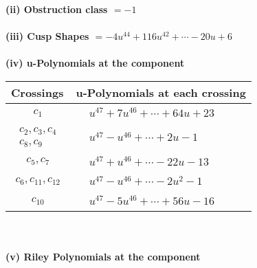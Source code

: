 \documentclass[1p]{elsarticle_modified}
\theoremstyle{definition}
\begin{document}
\flushleft \textbf{(ii) Obstruction class $= -1$}\\~\\
\flushleft \textbf{(iii) Cusp Shapes $= -4 u^{44}+116 u^{42}+\cdots-20 u+6$}\\~\\
\newpage\renewcommand{\arraystretch}{1}
\flushleft \textbf{(iv) u-Polynomials at the component}\newline \\
\begin{tabular}{m{50pt}|m{274pt}}
Crossings & \hspace{64pt}u-Polynomials at each crossing \\
\hline $$\begin{aligned}c_{1}\end{aligned}$$&$\begin{aligned}
&u^{47}+7 u^{46}+\cdots+64 u+23
\end{aligned}$\\
\hline $$\begin{aligned}c_{2},c_{3},c_{4}\\c_{8},c_{9}\end{aligned}$$&$\begin{aligned}
&u^{47}- u^{46}+\cdots+2 u-1
\end{aligned}$\\
\hline $$\begin{aligned}c_{5},c_{7}\end{aligned}$$&$\begin{aligned}
&u^{47}+u^{46}+\cdots-22 u-13
\end{aligned}$\\
\hline $$\begin{aligned}c_{6},c_{11},c_{12}\end{aligned}$$&$\begin{aligned}
&u^{47}- u^{46}+\cdots-2 u^2-1
\end{aligned}$\\
\hline $$\begin{aligned}c_{10}\end{aligned}$$&$\begin{aligned}
&u^{47}-5 u^{46}+\cdots+56 u-16
\end{aligned}$\\
\hline
\end{tabular}\\~\\
\newpage\renewcommand{\arraystretch}{1}
\flushleft \textbf{(v) Riley Polynomials at the component}\newline \\
\end{document}
